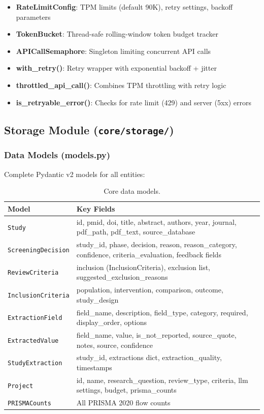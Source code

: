 \documentclass[11pt,a4paper]{article}
\begin{document}
\begin{itemize}[nosep]
  \item \textbf{RateLimitConfig}: TPM limits (default 90K), retry settings, backoff parameters
  \item \textbf{TokenBucket}: Thread-safe rolling-window token budget tracker
  \item \textbf{APICallSemaphore}: Singleton limiting concurrent API calls
  \item \textbf{with\_retry()}: Retry wrapper with exponential backoff + jitter
  \item \textbf{throttled\_api\_call()}: Combines TPM throttling with retry logic
  \item \textbf{is\_retryable\_error()}: Checks for rate limit (429) and server (5xx) errors
\end{itemize}

\subsection{Storage Module (\texttt{core/storage/})}

\subsubsection{Data Models (models.py)}

Complete Pydantic v2 models for all entities:

\begin{table}[H]
\centering\small
\begin{tabular}{lp{8cm}}
\toprule
\textbf{Model} & \textbf{Key Fields} \\
\midrule
\texttt{Study} & id, pmid, doi, title, abstract, authors, year, journal, pdf\_path, pdf\_text, source\_database \\
\texttt{ScreeningDecision} & study\_id, phase, decision, reason, reason\_category, confidence, criteria\_evaluation, feedback fields \\
\texttt{ReviewCriteria} & inclusion (InclusionCriteria), exclusion list, suggested\_exclusion\_reasons \\
\texttt{InclusionCriteria} & population, intervention, comparison, outcome, study\_design \\
\texttt{ExtractionField} & field\_name, description, field\_type, category, required, display\_order, options \\
\texttt{ExtractedValue} & field\_name, value, is\_not\_reported, source\_quote, notes, source, confidence \\
\texttt{StudyExtraction} & study\_id, extractions dict, extraction\_quality, timestamps \\
\texttt{Project} & id, name, research\_question, review\_type, criteria, llm settings, budget, prisma\_counts \\
\texttt{PRISMACounts} & All PRISMA 2020 flow counts \\
\bottomrule
\end{tabular}
\caption{Core data models.}
\end{table}
\end{document}
